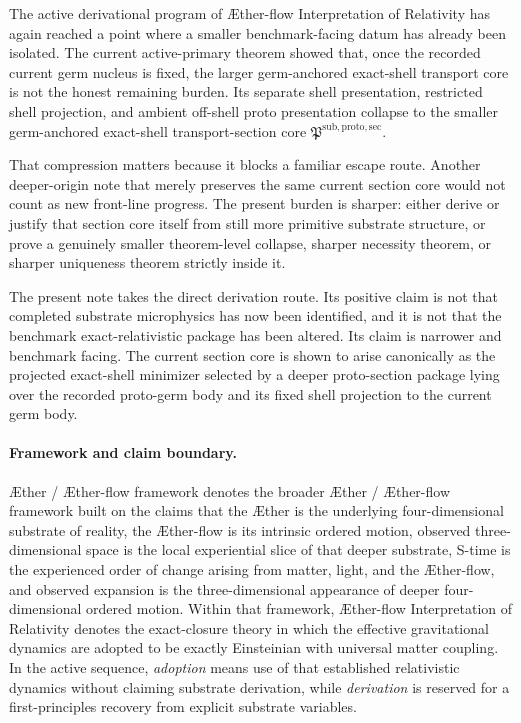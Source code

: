 \documentclass[11pt]{article}
\newcommand{\Aether}{\AE{}ther}
\newcommand{\Aflow}{\AE{}ther-flow}
\newcommand{\TheoryName}{\Aflow{} Interpretation of Relativity}
\newcommand{\TheoryProgram}{\Aether{} / \Aflow{} framework}
\newcommand{\ProtoSectionCore}{\mathfrak P^{\mathrm{sub,proto,sec}}}
\begin{document}
The active derivational program of \TheoryName{} has again reached a point where a smaller benchmark-facing datum has already been isolated. The current active-primary theorem showed that, once the recorded current germ nucleus is fixed, the larger germ-anchored exact-shell transport core is not the honest remaining burden. Its separate shell presentation, restricted shell projection, and ambient off-shell proto presentation collapse to the smaller germ-anchored exact-shell transport-section core \(\ProtoSectionCore\).

That compression matters because it blocks a familiar escape route. Another deeper-origin note that merely preserves the same current section core would not count as new front-line progress. The present burden is sharper: either derive or justify that section core itself from still more primitive substrate structure, or prove a genuinely smaller theorem-level collapse, sharper necessity theorem, or sharper uniqueness theorem strictly inside it.

The present note takes the direct derivation route. Its positive claim is not that completed substrate microphysics has now been identified, and it is not that the benchmark exact-relativistic package has been altered. Its claim is narrower and benchmark facing. The current section core is shown to arise canonically as the projected exact-shell minimizer selected by a deeper proto-section package lying over the recorded proto-germ body and its fixed shell projection to the current germ body.

\paragraph{Framework and claim boundary.}
\TheoryProgram{} denotes the broader \Aether{} / \Aflow{} framework built on the claims that the \Aether{} is the underlying four-dimensional substrate of reality, the \Aflow{} is its intrinsic ordered motion, observed three-dimensional space is the local experiential slice of that deeper substrate, S-time is the experienced order of change arising from matter, light, and the \Aflow{}, and observed expansion is the three-dimensional appearance of deeper four-dimensional ordered motion. Within that framework, \TheoryName{} denotes the exact-closure theory in which the effective gravitational dynamics are adopted to be exactly Einsteinian with universal matter coupling. In the active sequence, \emph{adoption} means use of that established relativistic dynamics without claiming substrate derivation, while \emph{derivation} is reserved for a first-principles recovery from explicit substrate variables.
\end{document}
